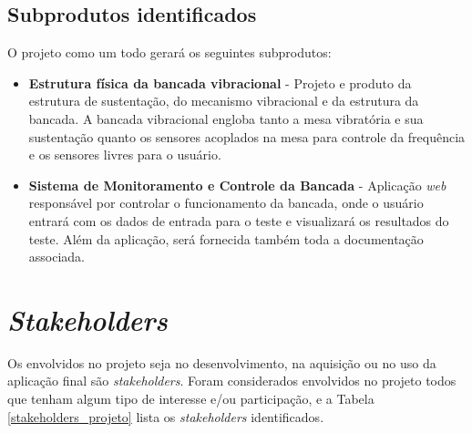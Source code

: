     \subsection*{Subprodutos identificados}
    
    	O projeto como um todo gerará os seguintes subprodutos:
        
        \begin{itemize}
        	\item \textbf{Estrutura física da bancada vibracional} - Projeto e produto
            			  da estrutura de sustentação, do mecanismo vibracional e da
                          estrutura da bancada. A bancada vibracional engloba tanto a
                          mesa vibratória e sua sustentação quanto os 
                          sensores acoplados na mesa para controle da frequência e os
                          sensores livres para o usuário.
        	\item \textbf{Sistema de Monitoramento e Controle da Bancada} - 
                          Aplicação \textit{web} responsável por controlar o
                          funcionamento da bancada, onde o usuário entrará com
                          os dados de entrada para o teste e visualizará os
                          resultados do teste. Além da aplicação, será fornecida
                          também toda a documentação associada.
        \end{itemize}

\section*{\textit{Stakeholders}}

Os envolvidos no projeto seja no desenvolvimento, na aquisição ou no uso da aplicação final são \textit{stakeholders}. Foram considerados envolvidos no projeto todos que tenham algum tipo de interesse e/ou participação, e a Tabela \ref{stakeholders_projeto} lista os \textit{stakeholders} identificados.
        
